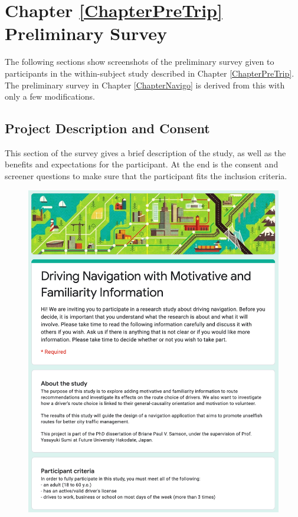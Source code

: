 \chapter{Chapter \ref{ChapterPreTrip} Preliminary Survey}
\label{AppendixD}

The following sections show screenshots of the preliminary survey given to participants in the within-subject study described in Chapter \ref{ChapterPreTrip}. The preliminary survey in Chapter \ref{ChapterNavigo} is derived from this with only a few modifications.

\section{Project Description and Consent}
This section of the survey gives a brief description of the study, as well as the benefits and expectations for the participant. At the end is the consent and screener questions to make sure that the participant fits the inclusion criteria. 
\begin{figure}[t]
  \centering
  \includegraphics[scale=0.6]{figures/d-info1.png}
\end{figure}

